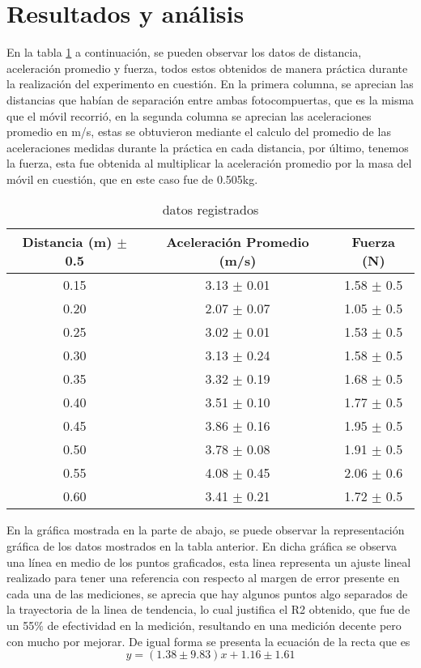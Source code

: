 \documentclass{article}
\begin{document}
\section{Resultados y análisis}\label{Resultados}			%
En la tabla \ref{tab:1} a continuación, se pueden observar los datos de distancia, aceleración promedio y fuerza, todos estos obtenidos de manera práctica durante la realización del experimento en cuestión. En la primera columna, se aprecian las distancias que habían de separación entre ambas fotocompuertas, que es la misma que el móvil recorrió, en la segunda columna se aprecian las aceleraciones promedio en m/s, estas se obtuvieron mediante el calculo del promedio de las aceleraciones medidas durante la práctica en cada distancia, por último, tenemos la fuerza, esta fue obtenida al multiplicar la aceleración promedio por la masa del móvil en cuestión, que en este caso fue de 0.505kg. 

\begin{table}[H]
	\centering
	\begin{tabular}{|c|c|c|}
\hline
Distancia (m) $\pm$ 0.5 &Aceleración Promedio (m/s) &Fuerza (N) \\
\hline
0.15 &3.13 $\pm$ 0.01 &1.58 $\pm$ 0.5 \\
\hline
0.20 &2.07 $\pm$ 0.07 &1.05 $\pm$ 0.5 \\
\hline
0.25 &3.02 $\pm$ 0.01 &1.53 $\pm$ 0.5 \\
\hline
0.30 &3.13 $\pm$ 0.24 &1.58 $\pm$ 0.5 \\
\hline
0.35 &3.32 $\pm$ 0.19 &1.68 $\pm$ 0.5 \\
\hline
0.40 &3.51 $\pm$ 0.10 &1.77 $\pm$ 0.5 \\
\hline
0.45 &3.86 $\pm$ 0.16 &1.95 $\pm$ 0.5 \\
\hline
0.50 &3.78 $\pm$ 0.08 &1.91 $\pm$ 0.5 \\
\hline
0.55 &4.08 $\pm$ 0.45 &2.06 $\pm$ 0.6 \\
\hline
0.60 &3.41 $\pm$ 0.21 &1.72 $\pm$ 0.5 \\
\hline
\end{tabular}
\caption{datos registrados}
\label{tab:1}
\end{table}

En la gráfica mostrada en la parte de abajo, se puede observar la representación gráfica de los datos mostrados en la tabla anterior. En dicha gráfica se observa una línea en medio de los puntos graficados, esta linea representa un ajuste lineal realizado para tener una referencia con respecto al margen de error presente en cada una de las mediciones, se aprecia que hay algunos puntos algo separados de la trayectoria de la linea de tendencia, lo cual justifica el R2 obtenido, que fue de un 55$\%$ de efectividad en la medición, resultando en una medición decente pero con mucho por mejorar. De igual forma se presenta la ecuación de la recta que es
\begin{equation*}
	y = (1.38 \pm 9.83)x + 1.16 \pm 1.61
\end{equation*}	
\end{document}
